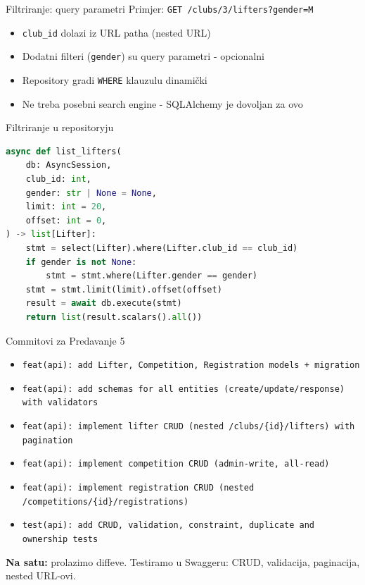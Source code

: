 \begin{frame}{Filtriranje: query parametri}
Primjer: \texttt{GET /clubs/3/lifters?gender=M}

\vspace{0.6em}
\begin{itemize}
  \item \texttt{club\_id} dolazi iz URL patha (nested URL)
  \item Dodatni filteri (\texttt{gender}) su query parametri - opcionalni
  \item Repository gradi \texttt{WHERE} klauzulu dinamički
  \item Ne treba posebni search engine - SQLAlchemy je dovoljan za ovo
\end{itemize}
\end{frame}

\begin{frame}[fragile,shrink=5]{Filtriranje u repositoryju}
\begin{lstlisting}[language=python]
async def list_lifters(
    db: AsyncSession,
    club_id: int,
    gender: str | None = None,
    limit: int = 20,
    offset: int = 0,
) -> list[Lifter]:
    stmt = select(Lifter).where(Lifter.club_id == club_id)
    if gender is not None:
        stmt = stmt.where(Lifter.gender == gender)
    stmt = stmt.limit(limit).offset(offset)
    result = await db.execute(stmt)
    return list(result.scalars().all())
\end{lstlisting}
\end{frame}

\begin{frame}{Commitovi za Predavanje 5}
\begin{itemize}
  \item \texttt{feat(api): add Lifter, Competition, Registration models + migration}
  \item \texttt{feat(api): add schemas for all entities (create/update/response) with validators}
  \item \texttt{feat(api): implement lifter CRUD (nested /clubs/\{id\}/lifters) with pagination}
  \item \texttt{feat(api): implement competition CRUD (admin-write, all-read)}
  \item \texttt{feat(api): implement registration CRUD (nested /competitions/\{id\}/registrations)}
  \item \texttt{test(api): add CRUD, validation, constraint, duplicate and ownership tests}
\end{itemize}

\vspace{0.4em}
\textbf{Na satu:} prolazimo diffeve. Testiramo u Swaggeru: CRUD, validacija, paginacija, nested URL-ovi.
\end{frame}

